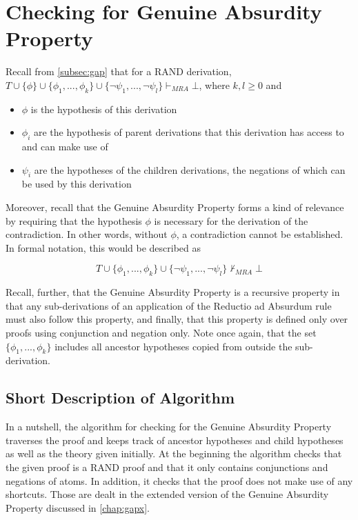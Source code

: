 \documentclass[11pt,twoside,a4paper]{report}
\begin{document}
\chapter{Checking for Genuine Absurdity Property}
\label{chap:gapcheck}
Recall from \autoref{subsec:gap} that for a RAND derivation, $T\cup\{\phi\}\cup\{\phi_1, ..., \phi_k\}\cup\{\neg\psi_1, ..., \neg\psi_l\}\vdash_{MRA}\bot$, where $k, l \geq 0$ and

\begin{itemize}
\item
$\phi$ is the hypothesis of this derivation
\item
$\phi_i$ are the hypothesis of parent derivations that this derivation has access to and can make use of
\item
$\psi_i$ are the hypotheses of the children derivations, the negations of which can be used by this derivation
\end{itemize}

Moreover, recall that the Genuine Absurdity Property forms a kind of relevance by requiring that the hypothesis $\phi$ is necessary for the derivation of the contradiction. In other words, without $\phi$, a contradiction cannot be established. In formal notation, this would be described as

\[T\cup\{\phi_1, ..., \phi_k\}\cup\{\neg\psi_1, ..., \neg\psi_l\}\nvdash_{MRA}\bot\]

Recall, further, that the Genuine Absurdity Property is a recursive property in that any sub-derivations of an application of the Reductio ad Absurdum rule must also follow this property, and finally, that this property is defined only over proofs using conjunction and negation only. Note once again, that the set $\{\phi_1, ..., \phi_k\}$ includes all ancestor hypotheses copied from outside the sub-derivation.

\section{Short Description of Algorithm}
In a nutshell, the algorithm for checking for the Genuine Absurdity Property traverses the proof and keeps track of ancestor hypotheses and child hypotheses as well as the theory given initially. At the beginning the algorithm checks that the given proof is a RAND proof and that it only contains conjunctions and negations of atoms. In addition, it checks that the proof does not make use of any shortcuts. Those are dealt in the extended version of the Genuine Absurdity Property discussed in \autoref{chap:gapx}.
\end{document}
